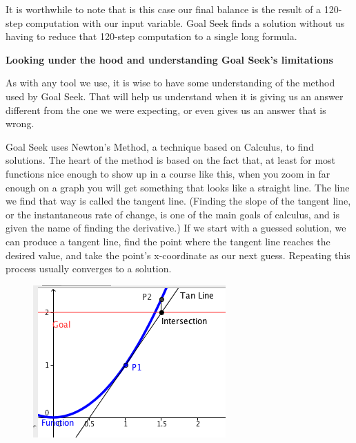 \documentclass[10pt,]{book}
\newcommand{\terminology}[1]{\textbf{#1}}
\theoremstyle{plain}
\theoremstyle{definition}
\theoremstyle{definition}
\begin{document}
%
\par

It is worthwhile to note that is this case our final balance is the result of a 120-step computation with our input variable.  Goal Seek finds a solution without us having to reduce that 120-step computation to a single long formula.




%
\par

\terminology{Looking under the hood and understanding Goal Seek's limitations}

%
\par

As with any tool we use, it is wise to have some understanding of the method used by Goal Seek.  That will help us understand when it is giving us an answer different from the one we were expecting, or even gives us an answer that is wrong.
%
\par

Goal Seek uses Newton's Method, a technique based on Calculus, to find solutions.  The heart of the method is based on the fact that, at least for most functions nice enough to show up in a course like this, when you zoom in far enough on a graph you will get something that looks like a straight line.  The line we find that way is called the tangent line.  (Finding the slope of the tangent line, or the instantaneous rate of change, is one of the main goals of calculus, and is given the name of finding the derivative.)  If we start with a guessed solution, we can produce a tangent line, find the point where the tangent line reaches the desired value, and take the point's x-coordinate as our next guess.  Repeating this process usually converges to a solution.

  \leavevmode%
\begin{figure}
\centering
\includegraphics[width=0.8\linewidth]{images/sec1-6-11.png}
\end{figure}
 
\end{document}
